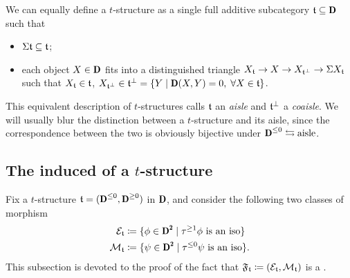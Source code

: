 

\begin{remark}
We can equally define a $t$-structure as a single full additive subcategory  $\t\subseteq \cD$ such that 
\begin{itemize}
	\item $\Sigma\mathfrak{t} \subseteq \mathfrak{t}$;
	\item each object $X\in\cD$ fits into a distinguished triangle $X_{\mathfrak{t}}\to X\to X_{\mathfrak{t}^\perp}\to \Sigma X_{\mathfrak{t}}$ such that $X_{\mathfrak{t}}\in\mathfrak{t}$, $X_{\tee^\perp}\in\tee^\perp = \{Y\mid \cD(X,Y)=0,\; \forall X\in\tee\}$.
\end{itemize}
This equivalent description of $t$-structures calls $\mathfrak{t}$ an \emph{aisle} and $\mathfrak{t}^\perp$ a \emph{coaisle}.  We will usually blur the distinction between a $t$-structure and its aisle, since the correspondence between the two is obviously bijective under $\cD^{\leq 0} \leftrightarrows \text{aisle}$.
\end{remark}

\subsection{The induced \hfs of a $t$-structure}
Fix a $t$-structure $\t = (\cD^{\leq  0}, \cD^{\geq 0} )$ in $\cD$, and consider the following two classes of morphism 
\begin{align}
\E_\t &  \coloneqq \{\phi\in \cD^\due \mid\tau^{\geq1}\phi \text{ is an iso}\}\notag\\
\M_\t &  \coloneqq \{\psi\in \cD^\due \mid\tau^{\leq0}\psi \text{ is an iso}\}.
\end{align}
This subsection is devoted to the proof of the fact that $\mathfrak{F}_{\mathfrak{t}} \coloneqq (\mathcal{E}_{\mathfrak{t}},\mathcal{M}_{\mathfrak{t}})$ is a \hfs.

